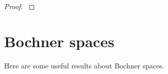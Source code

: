 \documentclass[english,a4paper,12pt,oneside]{scrbook}
\theoremstyle{break}
\newenvironment{mproof}[1][\proofname]{%
  \begin{proof}[#1]$ $\par\nobreak\ignorespaces
}{%
  \end{proof}
}
\renewcommand*{\proofname}{Proof}
\theoremstyle{remark}
\newcommand{\ds}{\displaystyle}
\newcommand{\cc}{\subset\subset}
\begin{document}
\begin{mproof}
%
%
%
%
%

\end{mproof}

\section{Bochner spaces}

Here are some useful results about Bochner spaces.
\end{document}
